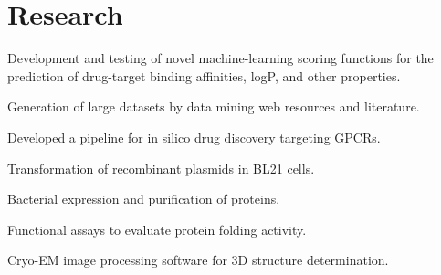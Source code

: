 \documentclass[]{deedy-resume-openfont}
\begin{document}
\begin{minipage}[t]{0.66\textwidth}

\section{Research}
\begin{tightemize}
\item Development and testing of novel machine-learning scoring functions for the prediction of drug-target binding affinities, logP, and other properties. \item Generation of large datasets by data mining web resources and literature. \item Developed a pipeline for in silico drug discovery targeting GPCRs.%
\end{tightemize}
\sectionsep


\begin{tightemize}
\item Transformation of recombinant plasmids in BL21 cells. \item Bacterial expression and purification of proteins.\item Functional assays to evaluate protein folding activity. \item Cryo-EM image processing software for 3D structure determination.\end{tightemize}
\sectionsep



\end{minipage}
\end{document}
